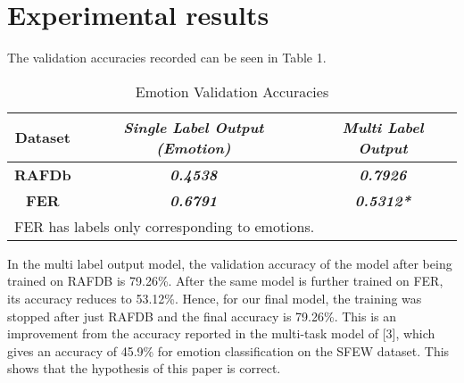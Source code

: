\documentclass[letterpaper,10pt]{article}
\begin{document}
\section{Experimental results}
The validation accuracies recorded can be seen in Table 1.
\begin{table}[htbp]

\begin{center}
\begin{tabular}{|c|c|c|}

\hline

\textbf{Dataset} & \textbf{\textit{Single Label 
Output (Emotion)}}& \textbf{\textit{Multi Label 
Output}} \\
\hline
\textbf{RAFDb} & \textbf{\textit{0.4538}}& \textbf{\textit{0.7926}} \\
\hline
\textbf{FER} & \textbf{\textit{0.6791}}& \textbf{\textit{0.5312*}} \\
\hline

\multicolumn{3}{l}{FER has labels only corresponding to emotions. 
}

\end{tabular}
\label{tab1}
\end{center}
\caption{Emotion Validation Accuracies}
\end{table}
In the multi label output model, the validation accuracy of the model after being trained on RAFDB is 79.26\%. After the same model is further trained on FER, its accuracy reduces to 53.12\%. Hence, for our final model, the training was stopped after just RAFDB and the final accuracy is 79.26\%. This is an improvement from the accuracy reported in the multi-task model of [3], which gives an accuracy of 45.9\% for emotion classification on the SFEW dataset. This shows that the hypothesis of this paper is correct.
\end{document}
